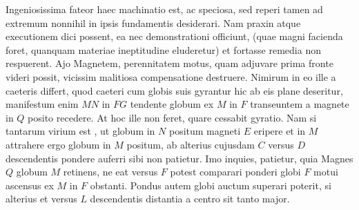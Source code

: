 \pend 
\pstart
Ingeniosissima fateor haec machinatio est, ac speciosa, sed reperi tamen ad extremum nonnihil in ipsis fundamentis desiderari. Nam  praxin atque executionem dici possent, ea nec demonstrationi officiunt, (quae magni facienda foret, quanquam materiae ineptitudine eluderetur) et fortasse remedia non respuerent. Ajo  Mag\-netem\protect{}, perennitatem motus\protect{}, quam adjuvare prima fronte videri possit, vicissim malitiosa compensatione destruere.
 \pend 
 \pstart 
Nimirum in eo ille a caeteris differt, quod caeteri cum globis suis gyrantur hic ab eis plane deseritur, manifestum enim  $MN$ in $FG$ tendente globum ex $M$ in $F$ transeuntem a magnete in $Q$ posito recedere. At hoc ille non feret, quare cessabit gyratio. \protect{} Nam si tantarum virium est , ut globum in $N$ positum magneti $E$ eripere et in $M$ attrahere %
{} ergo globum in $M$ positum, ab alterius cujusdam  $C$ versus $D$ descendentis pondere\protect{} auferri sibi non patietur. Imo inquies, patietur, quia Magnes\protect{} $Q$ globum $M$ retinens, ne eat versus $F$ potest comparari ponderi\protect{} globi $F$   motui ascensus ex $M$ in $F$ obstanti. Pondus \protect{} autem globi auctum superari poterit, si alterius  et versus $L$ descendentis distantia a centro sit tanto major.
